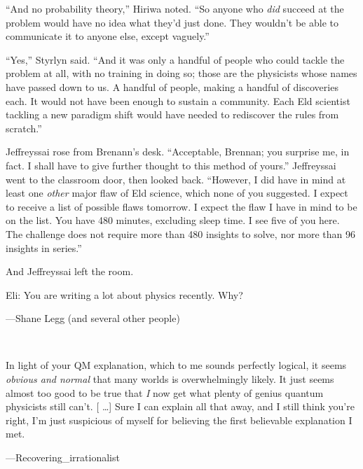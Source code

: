 {
 ``And no probability theory,''
Hiriwa noted. ``So anyone who \textit{did} succeed at
the problem would have no idea what they'd just done.
They wouldn't be able to communicate it to anyone else,
except vaguely.''}

{
 ``Yes,'' Styrlyn said.
``And it was only a handful of people who could tackle
the problem at all, with no training in doing so; those are the
physicists whose names have passed down to us. A handful of people,
making a handful of discoveries each. It would not have been enough to
sustain a community. Each Eld scientist tackling a new paradigm shift
would have needed to rediscover the rules from
scratch.''}

{
 Jeffreyssai rose from Brenann's desk.
``Acceptable, Brennan; you surprise me, in fact. I
shall have to give further thought to this method of
yours.'' Jeffreyssai went to the classroom door, then
looked back. ``However, I did have in mind at least
one \textit{other} major flaw of Eld science, which none of you
suggested. I expect to receive a list of possible flaws tomorrow. I
expect the flaw I have in mind to be on the list. You have 480 minutes,
excluding sleep time. I see five of you here. The challenge does not
require more than 480 insights to solve, nor more than 96 insights in
series.''}

{
 And Jeffreyssai left the room.}

\myendsectiontext


{
 Eli: You are writing a lot about physics recently. Why?}

{\raggedleft
 {}---Shane Legg (and several other people)
\par}


\bigskip

{
 ~}

{
 In light of your QM explanation, which to me sounds perfectly
logical, it seems \textit{obvious and normal} that many worlds is
overwhelmingly likely. It just seems almost too good to be true that
\textit{I} now get what plenty of genius quantum physicists still
can't. [ \ldots ] Sure I can explain all that away, and
I still think you're right, I'm just
suspicious of myself for believing the first believable explanation I
met.}

{\raggedleft
 {}---Recovering\_irrationalist
\par}


\bigskip

{
 ~}

